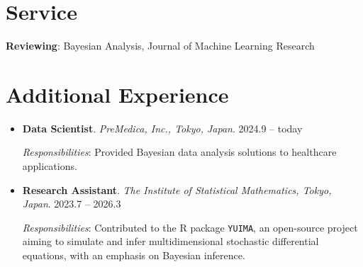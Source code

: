 \documentclass[
  11pt,
]{article}
\renewcommand{\labelitemi}{\textcolor{minty}{\faCheckCircle}} %
\begin{document}
\section{Service}\label{service}

\textbf{Reviewing}: Bayesian Analysis, Journal of Machine Learning
Research

\section{Additional Experience}\label{additional-experience}

\renewcommand{\labelitemi}{\textcolor{minty}{\faSuitcase}}

\begin{itemize}
\item
  \textbf{Data Scientist}. \emph{PreMedica, Inc., Tokyo, Japan}.
  \hfill {2024.9 -- today}

  \emph{Responsibilities}: Provided Bayesian data analysis solutions to
  healthcare applications.
\item
  \textbf{Research Assistant}. \emph{The Institute of Statistical
  Mathematics, Tokyo, Japan}. \hfill {2023.7 -- 2026.3}

  \emph{Responsibilities}: Contributed to the R package \texttt{YUIMA},
  an open-source project aiming to simulate and infer multidimensional
  stochastic differential equations, with an emphasis on Bayesian
  inference.
\end{itemize}
\end{document}
